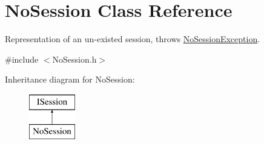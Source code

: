 \hypertarget{class_no_session}{\section{No\-Session Class Reference}
\label{class_no_session}
}


Representation of an un-\/existed session, throws \hyperlink{class_no_session_exception}{No\-Session\-Exception}.  




{\ttfamily \#include $<$No\-Session.\-h$>$}

Inheritance diagram for No\-Session\-:\begin{figure}[H]
\begin{center}
\leavevmode
\includegraphics[height=2.000000cm]{class_no_session}
\end{center}
\end{figure}
